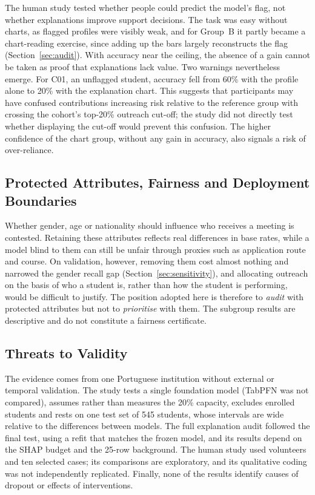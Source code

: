 The human study tested whether people could predict the model's flag, not whether explanations
improve support decisions. The task was easy without charts, as flagged profiles were visibly weak,
and for Group~B it partly became a chart-reading exercise, since adding up the bars largely
reconstructs the flag (Section~\ref{sec:audit}). With accuracy near the ceiling, the absence of a
gain cannot be taken as proof that explanations lack value. Two warnings nevertheless emerge. For
C01, an unflagged student, accuracy fell from 60\% with the profile alone to 20\% with the
explanation chart. This suggests that participants may have confused contributions increasing risk
relative to the reference group with crossing the cohort's top-20\% outreach cut-off; the study did
not directly test whether displaying the cut-off would prevent this confusion. The higher
confidence of the chart group, without any gain in accuracy, also signals a risk of over-reliance.

\subsection{Protected Attributes, Fairness and Deployment Boundaries}

Whether gender, age or nationality should influence who receives a meeting is contested. Retaining
these attributes reflects real differences in base rates, while a model blind to them can still be
unfair through proxies such as application route and course. On validation, however, removing them
cost almost nothing and narrowed the gender recall gap (Section~\ref{sec:sensitivity}), and
allocating outreach on the basis of who a student is, rather than how the student is performing,
would be difficult to justify. The position adopted here is therefore to \emph{audit} with protected
attributes but not to \emph{prioritise} with them. The subgroup results are descriptive and do not
constitute a fairness certificate.

\subsection{Threats to Validity}

The evidence comes from one Portuguese institution without external or temporal validation. The
study tests a single foundation model (TabPFN was not compared), assumes rather than measures the
20\% capacity, excludes enrolled students and rests on one test set of 545 students, whose intervals
are wide relative to the differences between models. The full explanation audit followed the final
test, using a refit that matches the frozen model, and its results depend on the SHAP budget and the
25-row background. The human study used volunteers and ten selected cases; its comparisons are
exploratory, and its qualitative coding was not independently replicated.
Finally, none of the results identify causes of dropout or effects of interventions.
